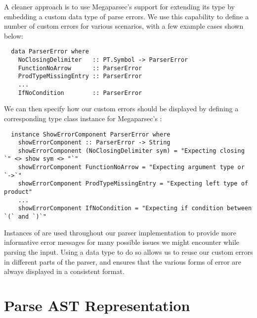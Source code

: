 A cleaner approach is to use Megaparsec's support for extending its
 type by embedding a custom data type of parse errors.
We use this capability to define a number of custom errors for various scenarios,
with a few example cases shown below:
%
\begin{verbatim}
  data ParserError where
    NoClosingDelimiter   :: PT.Symbol -> ParserError
    FunctionNoArrow      :: ParserError
    ProdTypeMissingEntry :: ParserError
    ...
    IfNoCondition        :: ParserError
\end{verbatim}

We can then specify how our custom errors should be displayed by defining a
corresponding type class instance for Megaparsec's :
%
\begin{verbatim}
  instance ShowErrorComponent ParserError where
    showErrorComponent :: ParserError -> String
    showErrorComponent (NoClosingDelimiter sym) = "Expecting closing `" <> show sym <> "`"
    showErrorComponent FunctionNoArrow = "Expecting argument type or `->`"
    showErrorComponent ProdTypeMissingEntry = "Expecting left type of product"
    ...
    showErrorComponent IfNoCondition = "Expecting if condition between `(` and `)`"
\end{verbatim}

Instances of  are used throughout our parser implementation
to provide more informative error messages for many possible issues we might
encounter while parsing the input.
Using a data type to do so allows us to reuse our custom errors in different
parts of the parser, and ensures that the various forms of error are always
displayed in a consistent format.




\section{Parse AST Representation} \label{sec:parse-ast}

